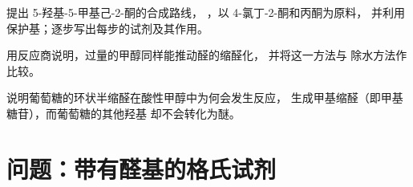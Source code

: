 \begin{exercise}[$\star\star\star$]\label{exo:b1:acetals-protection:10}
提出 5-羟基-5-甲基己-2-酮的合成路线，
，以 4-氯丁-2-酮和丙酮为原料，
并利用保护基；逐步写出每步的试剂及其作用。
\end{exercise}

\begin{exercise}[$\star\star\star$]\label{exo:b1:acetals-protection:11}
用反应商说明，过量的甲醇同样能推动醛的缩醛化，
并将这一方法与
除水方法作比较。
\end{exercise}

\begin{exercise}[$\star\star\star$]\label{exo:b1:acetals-protection:12}
说明葡萄糖的环状半缩醛在酸性甲醇中为何会发生反应，
生成甲基缩醛（即甲基糖苷），而葡萄糖的其他羟基
却不会转化为醚。
\end{exercise}

\section{问题：带有醛基的格氏试剂}

